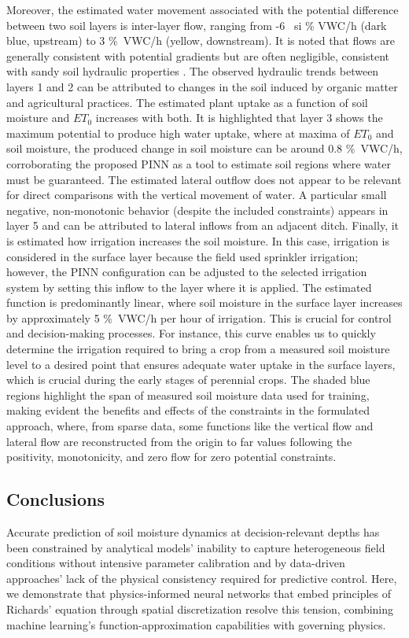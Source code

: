 \documentclass[pdflatex,sn-nature]{sn-jnl}%
\theoremstyle{thmstyleone}%
\theoremstyle{thmstyletwo}%
\theoremstyle{thmstylethree}%
\begin{document}
Moreover, the estimated water movement associated with the potential difference between two soil layers is inter-layer flow, ranging from -6 \ si {\% VWC/h} (dark blue, upstream) to 3 \si{\%VWC/h} (yellow, downstream). It is noted that flows are generally consistent with potential gradients but are often negligible, consistent with sandy soil hydraulic properties \cite{Reyes2016}. The observed hydraulic trends between layers 1 and 2 can be attributed to changes in the soil induced by organic matter and agricultural practices.
The estimated plant uptake as a function of soil moisture and $ET_0$ increases with both. It is highlighted that layer 3 shows the maximum potential to produce high water uptake, where at maxima of $ET_0$ and soil moisture, the produced change in soil moisture can be around 0.8 \si{\%VWC/h}, corroborating the proposed PINN as a tool to estimate soil regions where water must be guaranteed.
The estimated lateral outflow does not appear to be relevant for direct comparisons with the vertical movement of water. A particular small negative, non-monotonic behavior (despite the included constraints) appears in layer 5 and can be attributed to lateral inflows from an adjacent ditch.
Finally, it is estimated how irrigation increases the soil moisture. In this case, irrigation is considered in the surface layer because the field used sprinkler irrigation; however, the PINN configuration can be adjusted to the selected irrigation system by setting this inflow to the layer where it is applied. The estimated function is predominantly linear, where soil moisture in the surface layer increases by approximately 5 \si{\%VWC/h} per hour of irrigation. This is crucial for control and decision-making processes. For instance, this curve enables us to quickly determine the irrigation required to bring a crop from a measured soil moisture level to a desired point that ensures adequate water uptake in the surface layers, which is crucial during the early stages of perennial crops.
The shaded blue regions highlight the span of measured soil moisture data used for training, making evident the benefits and effects of the constraints in the formulated approach, where, from sparse data, some functions like the vertical flow and lateral flow are reconstructed from the origin to far values following the positivity, monotonicity, and zero flow for zero potential constraints.

  
\subsection{Conclusions}
Accurate prediction of soil moisture dynamics at decision-relevant depths has been constrained by analytical models' inability to capture heterogeneous field conditions without intensive parameter calibration and by data-driven approaches' lack of the physical consistency required for predictive control. Here, we demonstrate that physics-informed neural networks that embed principles of Richards' equation through spatial discretization resolve this tension, combining machine learning's function-approximation capabilities with governing physics.
\end{document}
